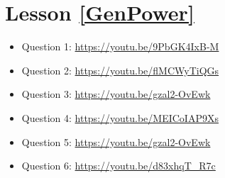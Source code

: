 \section*{Lesson \ref{GenPower}}
\begin{multicols}{2}
\begin{itemize}[leftmargin=*]
    \item Question 1: \url{https://youtu.be/9PbGK4IxB-M}
    \item Question 2: \url{https://youtu.be/flMCWyTiQGs}
    \item Question 3: \url{https://youtu.be/gzal2-OvEwk}
    \item Question 4: \url{https://youtu.be/MEICoIAP9Xs} 
    \item Question 5: \url{https://youtu.be/gzal2-OvEwk} 
    \item Question 6: \url{https://youtu.be/d83xhqT_R7c} 
\end{itemize}
\end{multicols}

